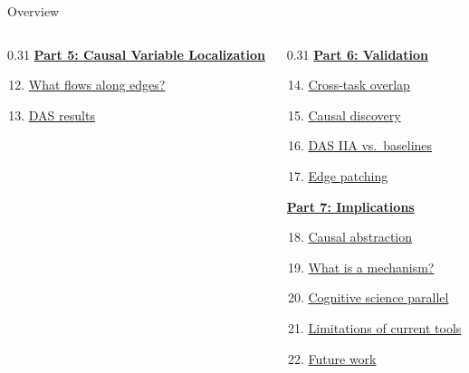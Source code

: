 \documentclass[10pt,aspectratio=169]{beamer}
\begin{document}
\begin{frame}{Overview}
\begin{columns}[T]
\begin{column}{0.31\textwidth}
\vspace{0.8em}
\textbf{\hyperlink{sl:cvl}{Part 5: Causal Variable Localization}}
\begin{enumerate}\setcounter{enumi}{11}
  \item \hyperlink{sl:cvl}{What flows along edges?}
  \item \hyperlink{sl:dasresults}{DAS results}
\end{enumerate}
\end{column}

\begin{column}{0.31\textwidth}
\textbf{\hyperlink{sl:validation}{Part 6: Validation}}
\begin{enumerate}\setcounter{enumi}{13}
  \item \hyperlink{sl:circuitoverlap}{Cross-task overlap}
  \item \hyperlink{sl:causaldiscovery}{Causal discovery}
  \item \hyperlink{sl:dasbaselines}{DAS IIA vs.\ baselines}
  \item \hyperlink{sl:edgepatching}{Edge patching}
\end{enumerate}

\vspace{0.8em}
\textbf{\hyperlink{sl:discussion}{Part 7: Implications}}
\begin{enumerate}\setcounter{enumi}{17}
  \item \hyperlink{sl:discussion}{Causal abstraction}
  \item \hyperlink{sl:mechanism}{What is a mechanism?}
  \item \hyperlink{sl:cogsci}{Cognitive science parallel}
  \item \hyperlink{sl:tooling}{Limitations of current tools}
  \item \hyperlink{sl:tokenization}{Future work}
\end{enumerate}
\end{column}
\end{columns}
\end{frame}

\begin{frame}
\begin{center}
\vfill
  {\setlength{\fboxrule}{2.5pt}}
\vfill
\end{center}
\end{frame}
\end{document}
